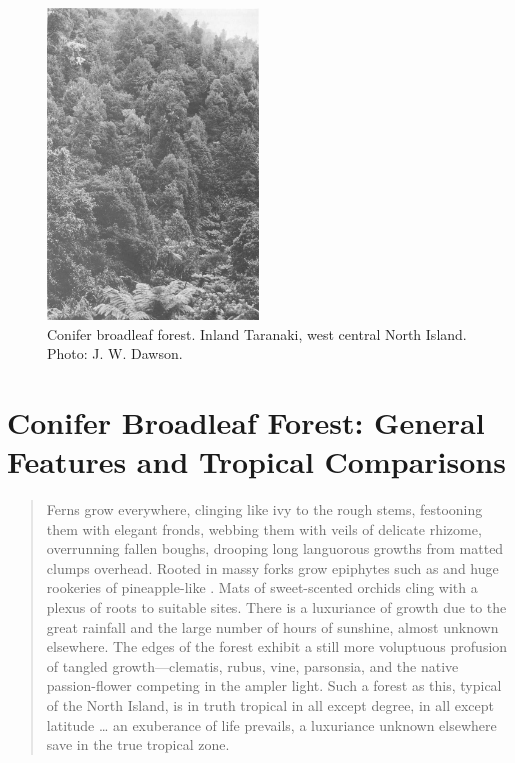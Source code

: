 \begin{figure}
	\includegraphics[width=0.5\textwidth]{graphics/figure6conifer-broadleaf.jpg}
	\centering
	\caption[Conifer broadleaf forest, inland Taranaki]{Conifer broadleaf forest.
Inland Taranaki, west central North Island.
	Photo: J. W. Dawson.}%
	\label{fig:6conifer-broadleaf}
\end{figure}

\chapter{Conifer Broadleaf Forest: General Features and Tropical Comparisons}

\begin{quote}
	Ferns grow everywhere, clinging like ivy to the rough stems, festooning them with elegant fronds, webbing them with veils of delicate rhizome, overrunning fallen boughs, drooping long languorous growths from matted clumps overhead.
	Rooted in massy forks grow epiphytes such as  and huge rookeries of pineapple-like .
	Mats of sweet-scented orchids cling with a plexus of roots to suitable sites.
	There is a luxuriance of growth due to the great rainfall and the large number of hours of sunshine, almost unknown elsewhere.
	The edges of the forest exhibit a still more voluptuous profusion of tangled growth---clematis, rubus, vine, parsonsia, and the native passion-flower competing in the ampler light.
	Such a forest as this, typical of the North Island, is in truth tropical in all except degree, in all except latitude … an exuberance of life prevails, a luxuriance unknown elsewhere save in the true tropical zone.
\end{quote}

